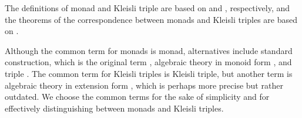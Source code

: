 The definitions of monad and Kleisli triple are based on
\parencite[137]{maclane-1998} and \parencite[58]{moggi-1991},
respectively, and the theorems of the correspondence between monads
and Kleisli triples are based on \parencites[24,
  26--29]{manes-1976}[61]{moggi-1991}.

\begin{terminology}
  \label{ter:monads}

  Although the common term for monads is monad, alternatives include
  standard construction, which is the original term
  \parencite[30]{manes-1976}, algebraic theory in monoid form
  \parencite[29]{manes-1976}, and triple
  \parencites[83]{barr-2005}[372]{barr-wells-2012}. The common term
  for Kleisli triples is Kleisli triple, but another term is algebraic
  theory in extension form \parencite[32]{manes-1976}, which is
  perhaps more precise but rather outdated. We choose the common terms
  for the sake of simplicity and for effectively distinguishing
  between monads and Kleisli triples.

\end{terminology}

\clearemptydoublepage

